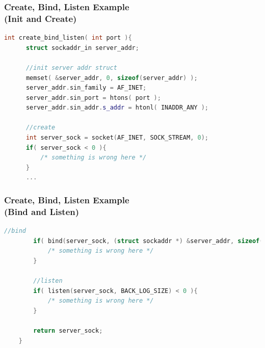 \documentclass[aspectratio=43]{beamer}
\begin{document}
\begin{frame}[fragile]
  \frametitle{Create, Bind, Listen Example\\ (Init and Create)}

  \begin{lstlisting}[language=C++,basicstyle=\ttfamily\footnotesize,commentstyle=\color{commgreen},keywordstyle=\color{blue},breaklines=true]
  int create_bind_listen( int port ){
      struct sockaddr_in server_addr;
  
      //init server addr struct
      memset( &server_addr, 0, sizeof(server_addr) );
      server_addr.sin_family = AF_INET;
      server_addr.sin_port = htons( port );
      server_addr.sin_addr.s_addr = htonl( INADDR_ANY );
      
      //create
      int server_sock = socket(AF_INET, SOCK_STREAM, 0);
      if( server_sock < 0 ){
          /* something is wrong here */
      }
      ...
  \end{lstlisting}
\end{frame}

\begin{frame}[fragile]
  \frametitle{Create, Bind, Listen Example\\ (Bind and Listen)}

  \begin{lstlisting}[language=C++,basicstyle=\ttfamily\footnotesize,commentstyle=\color{commgreen},keywordstyle=\color{blue},breaklines=true]
	    //bind
	    if( bind(server_sock, (struct sockaddr *) &server_addr, sizeof(server_addr)) < 0 ){
	        /* something is wrong here */
	    }
	    
	    //listen
	    if( listen(server_sock, BACK_LOG_SIZE) < 0 ){
	        /* something is wrong here */            
	    }
	    
	    return server_sock;
	}
  \end{lstlisting}
\end{frame}
\end{document}
